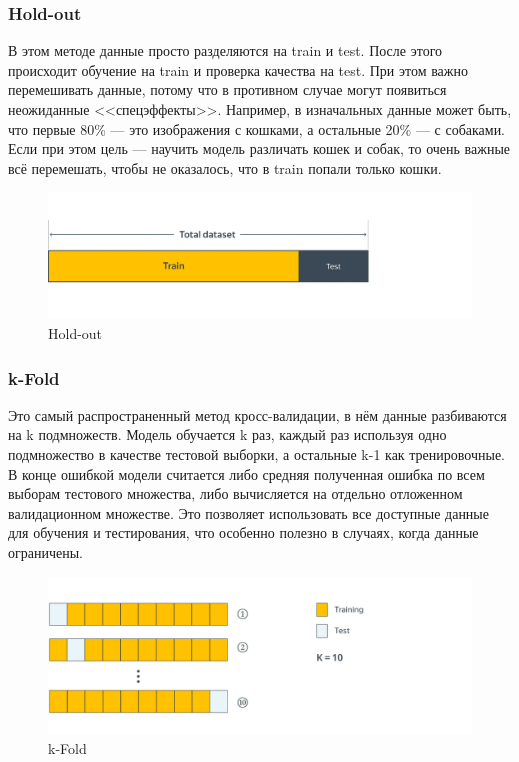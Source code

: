 \subsubsection{Hold-out}

В этом методе данные просто разделяются на train и test. После этого происходит обучение на train и проверка качества на test. При этом важно перемешивать данные, потому что в противном случае могут появиться неожиданные <<спецэффекты>>. Например, в изначальных данные может быть, что первые 80\% --- это изображения с кошками, а остальные 20\% --- с собаками. Если при этом цель --- научить модель различать кошек и собак, то очень важные всё перемешать, чтобы не оказалось, что в train попали только кошки.

\begin{figure}[h]
	\centering
	\includegraphics[width=\textwidth/2]{hold_out.png}
	\caption{Hold-out}
	\label{img:hold-out}
\end{figure}

\subsubsection{k-Fold}

Это самый распространенный метод кросс-валидации, в нём данные разбиваются на k подмножеств. Модель обучается k раз, каждый раз используя одно подмножество в качестве тестовой выборки, а остальные k-1 как тренировочные. В конце ошибкой модели считается либо средняя полученная ошибка по всем выборам тестового множества, либо вычисляется на отдельно отложенном валидационном множестве. Это позволяет использовать все доступные данные для обучения и тестирования, что особенно полезно в случаях, когда данные ограничены.

\begin{figure}[h]
	\centering
	\includegraphics[width=\textwidth/2]{k-fold.png}
	\caption{k-Fold}
	\label{img:k-fold}
\end{figure}

